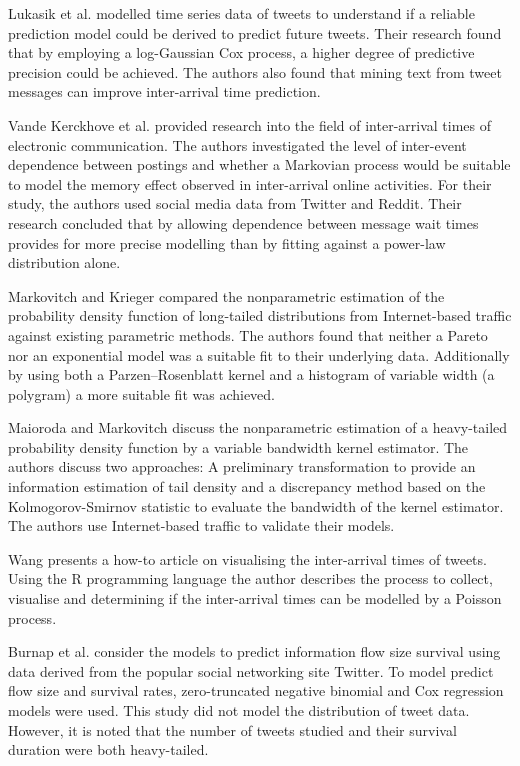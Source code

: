 Lukasik et al. \cite{lukasik2015modeling} modelled time series data of tweets to understand if a reliable prediction model could be derived to predict future tweets. Their research found that by employing a log-Gaussian Cox process, a higher degree of predictive precision could be achieved. The authors also found that mining text from tweet messages can improve inter-arrival time prediction.

Vande Kerckhove et al. \cite{vande2015markov} provided research into the field of inter-arrival times of electronic communication. The authors investigated the level of inter-event dependence between postings and whether a Markovian process would be suitable to model the memory effect observed in inter-arrival online activities. For their study, the authors used social media data from Twitter and Reddit. Their research concluded that by allowing dependence between message wait times provides for more precise modelling than by fitting against a power-law distribution alone.

Markovitch and Krieger \cite{markovitch2000nonparametric} compared the nonparametric estimation of the probability density function of long-tailed distributions from Internet-based traffic against existing parametric methods. The authors found that neither a Pareto nor an exponential model was a suitable fit to their underlying data. Additionally by using both a Parzen--Rosenblatt kernel and a histogram of variable width (a polygram) a more suitable fit was achieved.

Maioroda and Markovitch \cite{maiboroda2004estimation} discuss the nonparametric estimation of a heavy-tailed probability density function by a variable bandwidth kernel estimator. The authors discuss two approaches: A preliminary transformation to provide an information estimation of tail density and a discrepancy method based on the Kolmogorov-Smirnov statistic to evaluate the bandwidth of the kernel estimator. The authors use Internet-based traffic to validate their models.

Wang \cite{viztweettimes} presents a how-to article on visualising the inter-arrival times of tweets. Using the R programming language the author describes the process to collect, visualise and determining if the inter-arrival times can be modelled by a Poisson process.

Burnap et al. \cite{burnap2014tweeting} consider the models to predict information flow size survival using data derived from the popular social networking site Twitter. To model predict flow size and survival rates, zero-truncated negative binomial and Cox regression models were used. This study did not model the distribution of tweet data. However, it is noted that the number of tweets studied and their survival duration were both heavy-tailed. 

